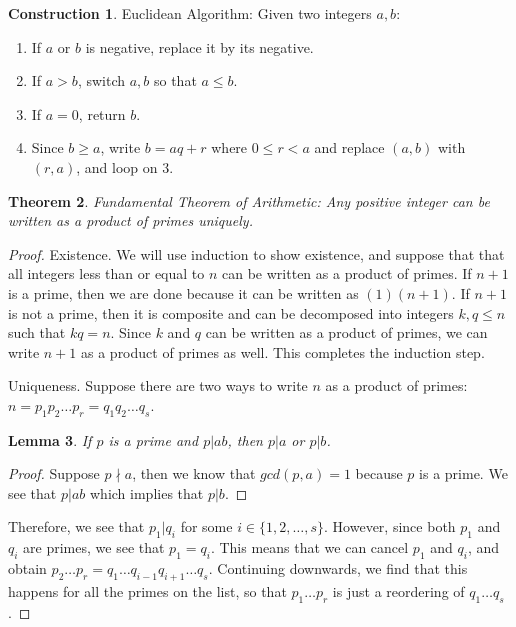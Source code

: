 \documentclass[psamsfonts]{amsart}
\newtheorem{thm}{Theorem}[section]
\newtheorem{lem}[thm]{Lemma}
\theoremstyle{definition}
\newtheorem{con}[thm]{Construction}
\theoremstyle{remark}
\numberwithin{equation}{section}
\begin{document}
\begin{con}
Euclidean Algorithm: Given two integers $a,b$:
\begin{enumerate}
\item If $a$ or $b$ is negative, replace it by its negative.
\item If $a > b$, switch $a,b$ so that $a \leq b$.
\item If $a = 0$, return $b$.
\item Since $b \geq a$, write $b = aq + r$ where $0 \leq r < a$ and replace $(a,b)$ with $(r,a)$, and loop on $3$. 
\end{enumerate}
\end{con}

\begin{thm}
Fundamental Theorem of Arithmetic: Any positive integer can be written as a product of primes uniquely. 
\end{thm}

\begin{proof}
Existence. We will use induction to show existence, and suppose that that all integers less than or equal to $n$ can be written as a product of primes. If $n+1$ is a prime, then we are done because it can be written as $(1)(n+1)$. If $n+1$ is not a prime, then it is composite and can be decomposed into integers $k,q \leq n$ such that $kq = n$. Since $k$ and $q$ can be written as a product of primes, we can write $n+1$ as a product of primes as well. This completes the induction step.

Uniqueness. Suppose there are two ways to write $n$ as a product of primes: $n = p_1 p_2 \ldots p_r = q_1 q_2 \ldots q_s$. 
\begin{lem}
If $p$ is a prime and $p | ab$, then $p|a$ or $p | b$. 
\end{lem}

\begin{proof}
Suppose $p \nmid a$, then we know that $gcd(p,a) = 1$ because $p$ is a prime. We see that $p|ab$ which implies that $p | b$. 
\end{proof}

Therefore, we see that $p_1 | q_i$ for some $i \in \{1, 2, \ldots,s \}$. However, since both $p_1$ and $q_i$ are primes, we see that $p_1 = q_i$. This means that we can cancel $p_1$ and $q_i$, and obtain $p_2 \ldots p_r = q_1 \ldots q_{i-1} q_{i+1} \ldots q_s$. Continuing downwards, we find that this happens for all the primes on the list, so that $p_1 \ldots p_r$ is just a reordering of $q_1 \ldots q_s$. 
\end{proof}
\end{document}
